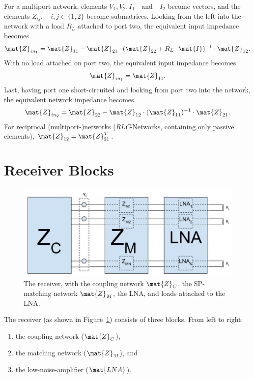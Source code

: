 For a multiport network, elements $V_1,V_2,I_1\quad\text{and}\quad I_2$ become vectors, and the elements $Z_{ij},\quad i,j\in\{1,2\}$ become submatrices.
Looking from the left into the network with a load $R_L$ attached to port two, the equivalent input impedance becomes
\begin{equation}
\label{eq:eq_imp_load}
\mat{Z}_{in_1} = \mat{Z}_{11} - \mat{Z}_{21}\cdot(\mat{Z}_{22} + R_L\cdot\mat{I})^{-1}\cdot \mat{Z}_{12}.
\end{equation}
With no load attached on port two, the equivalent input impedance becomes
\begin{equation}
\label{eq:eq_imp_oc}
\mat{Z}_{in_1} = \mat{Z}_{11}.
\end{equation}
Last, having port one short-circuited and looking from port two into the network, the equivalent network impedance becomes
\begin{equation}
\label{eq:eq_imp_sc}
\mat{Z}_{in_2} = \mat{Z}_{22} - \mat{Z}_{12}\cdot(\mat{Z}_{11})^{-1}\cdot \mat{Z}_{21}.
\end{equation}
For reciprocal (multiport-)networks (\textit{RLC}-Networks, containing only passive elements), $\mat{Z}_{12} = \mat{Z}_{21}^T$.

\section{Receiver Blocks}
\begin{figure}
\centering
  \includegraphics[width=\linewidth]{images/Receiver.jpg}
\caption{The receiver, with the coupling network $\mat{Z}_C$, the SP-matching network $\mat{Z}_M$, the LNA, and loads attached to the LNA.}
\label{fig:receiver}
\end{figure}
The receiver (as shown in Figure~\ref{fig:receiver}) consists of three blocks.
From left to right:
\begin{enumerate}
\item{the coupling network ($\mat{Z}_C$),}
\item{the matching network ($\mat{Z}_M$), and}
\item{the low-noise-amplifier ($\mat{LNA}$).}
\end{enumerate}
 
